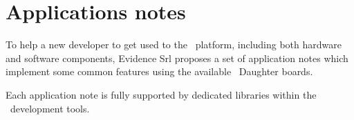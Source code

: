 \chapter{Applications notes}
\label{ch:app-notes}

To help a new developer to get used to the \flex\ platform, including 
both hardware and software components, Evidence Srl proposes a set of 
application notes which implement some common features using the 
available \flex\ Daughter boards. 

Each application note is fully supported by dedicated libraries within 
the \ee\ development tools.




